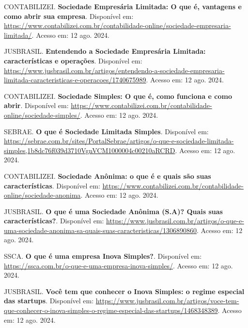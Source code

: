 \noindent CONTABILIZEI. \textbf{Sociedade Empresária Limitada: O que é, vantagens e como abrir sua empresa}. Disponível em: \url{https://www.contabilizei.com.br/contabilidade-online/sociedade-empresaria-limitada/}. Acesso em: 12 ago. 2024.

\noindent JUSBRASIL. \textbf{Entendendo a Sociedade Empresária Limitada: características e operações}. Disponível em: \url{https://www.jusbrasil.com.br/artigos/entendendo-a-sociedade-empresaria-limitada-caracteristicas-e-operacoes/1740675989}. Acesso em: 12 ago. 2024.

\noindent CONTABILIZEI. \textbf{Sociedade Simples: O que é, como funciona e como abrir}. Disponível em: \url{https://www.contabilizei.com.br/contabilidade-online/sociedade-simples/}. Acesso em: 12 ago. 2024.

\noindent SEBRAE. \textbf{O que é Sociedade Limitada Simples}. Disponível em: \url{https://sebrae.com.br/sites/PortalSebrae/artigos/o-que-e-sociedade-limitada-simples,1b8dc76f039d3710VgnVCM1000004c00210aRCRD}. Acesso em: 12 ago. 2024.

\noindent CONTABILIZEI. \textbf{Sociedade Anônima: o que é e quais são suas características}. Disponível em: \url{https://www.contabilizei.com.br/contabilidade-online/sociedade-anonima}. Acesso em: 12 ago. 2024.

\noindent JUSBRASIL. \textbf{O que é uma Sociedade Anônima (S.A)? Quais suas características?}. Disponível em: \url{https://www.jusbrasil.com.br/artigos/o-que-e-uma-sociedade-anonima-sa-quais-suas-caracteristicas/1306890860}. Acesso em: 12 ago. 2024.

\noindent SSCA. \textbf{O que é uma empresa Inova Simples?}. Disponível em: \url{https://ssca.com.br/o-que-e-uma-empresa-inova-simples/}. Acesso em: 12 ago. 2024.

\noindent JUSBRASIL. \textbf{Você tem que conhecer o Inova Simples: o regime especial das startups}. Disponível em: \url{https://www.jusbrasil.com.br/artigos/voce-tem-que-conhecer-o-inova-simples-o-regime-especial-das-startups/1468348389}. Acesso em: 12 ago. 2024.

